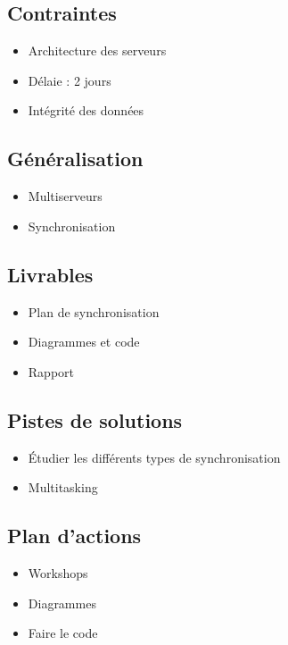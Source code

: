\subsection*{Contraintes}
{}
\begin{itemize}
	\item Architecture des serveurs
	\item Délaie : 2 jours
	\item Intégrité des données
\end{itemize}

\subsection*{Généralisation}
{}
\begin{itemize}
	\item Multiserveurs
	\item Synchronisation
\end{itemize}

\subsection*{Livrables}
{}
\begin{itemize}
	\item Plan de synchronisation
	\item Diagrammes et code
	\item Rapport
\end{itemize}

\subsection*{Pistes de solutions}
{}
\begin{itemize}
	\item Étudier les différents types de synchronisation
	\item Multitasking
\end{itemize}

\subsection*{Plan d'actions}
{}
\begin{itemize}
	\item Workshops
	\item Diagrammes
	\item Faire le code
\end{itemize}

